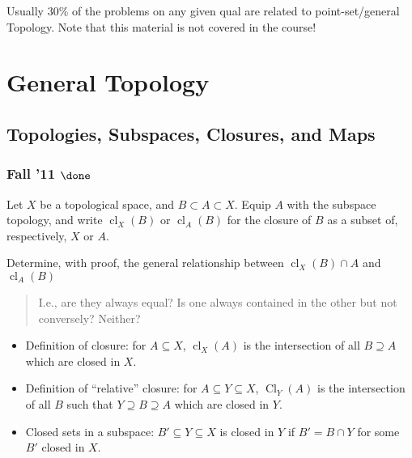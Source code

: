 \begin{warnings}

Usually 30\% of the problems on any given qual are related to
point-set/general Topology. Note that this material is not covered in
the course!

\end{warnings}

\hypertarget{general-topology}{%
\section{General Topology}\label{general-topology}}

\hypertarget{topologies-subspaces-closures-and-maps}{%
\subsection{Topologies, Subspaces, Closures, and
Maps}\label{topologies-subspaces-closures-and-maps}}

\hypertarget{fall-11-done}{%
\subsubsection{\texorpdfstring{Fall '11
\(\done\)}{Fall '11 \textbackslash done}}\label{fall-11-done}}

\begin{problem}[Fall 2011]

Let \(X\) be a topological space, and \(B \subset A \subset X\). Equip
\(A\) with the subspace topology, and write
\({ \operatorname{cl}} _X (B)\) or \({ \operatorname{cl}} _A (B)\) for
the closure of \(B\) as a subset of, respectively, \(X\) or \(A\).

Determine, with proof, the general relationship between
\({ \operatorname{cl}} _X (B) \cap A\) and
\({ \operatorname{cl}} _A (B)\)

\begin{quote}
I.e., are they always equal? Is one always contained in the other but
not conversely? Neither?
\end{quote}

\end{problem}

\begin{concept}

\envlist

\begin{itemize}
\tightlist
\item
  Definition of closure: for \(A\subseteq X\),
  \({ \operatorname{cl}} _X(A)\) is the intersection of all
  \(B\supseteq A\) which are closed in \(X\).
\item
  Definition of ``relative'' closure: for \(A\subseteq Y \subseteq X\),
  \({ \operatorname{Cl}} _Y(A)\) is the intersection of all \(B\) such
  that \(Y\supseteq B \supseteq A\) which are closed in \(Y\).
\item
  Closed sets in a subspace: \(B' \subseteq Y\subseteq X\) is closed in
  \(Y\) if \(B' = B\cap Y\) for some \(B'\) closed in \(X\).
\end{itemize}

\end{concept}

